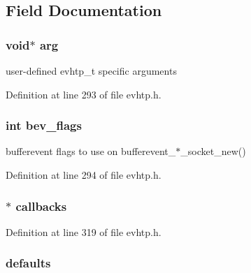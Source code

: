 \subsection{Field Documentation}
\hypertarget{structevhtp__s_a9ce2ec4812a92cb6ab39f6e81e9173a9}{
\subsubsection[{arg}]{\setlength{\rightskip}{0pt plus 5cm}void$\ast$ arg}}\label{structevhtp__s_a9ce2ec4812a92cb6ab39f6e81e9173a9}
user-\/defined evhtp\-\_\-t specific arguments 

Definition at line 293 of file evhtp.\-h.

\hypertarget{structevhtp__s_a8d3f621cd735373f6657f8ea1a4d21de}{
\subsubsection[{bev\-\_\-flags}]{\setlength{\rightskip}{0pt plus 5cm}int bev\-\_\-flags}}\label{structevhtp__s_a8d3f621cd735373f6657f8ea1a4d21de}
bufferevent flags to use on bufferevent\-\_\-$\ast$\-\_\-socket\-\_\-new() 

Definition at line 294 of file evhtp.\-h.

\hypertarget{structevhtp__s_a43bc08d49284feb774b73ee06cf0a769}{
\subsubsection[{callbacks}]{$\ast$ callbacks}}\label{structevhtp__s_a43bc08d49284feb774b73ee06cf0a769}


Definition at line 319 of file evhtp.\-h.

\hypertarget{structevhtp__s_a5ca39f6268aea8173dbdc0a1e297925b}{
\subsubsection[{defaults}]{ defaults}}\label{structevhtp__s_a5ca39f6268aea8173dbdc0a1e297925b}


